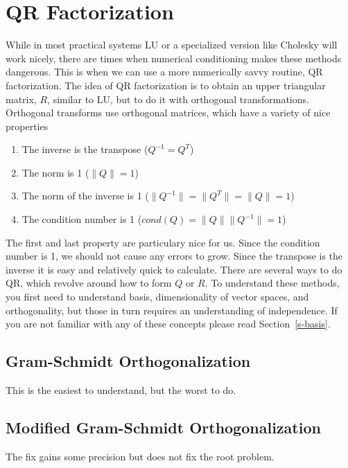 
\section{QR Factorization}

While in most practical systems LU or a specialized version like Cholesky will work nicely, there are times when numerical conditioning makes these methods dangerous.  This is when we can use a more numerically savvy routine, QR factorization.  The idea of QR factorization is to obtain an upper triangular matrix, $R$, similar to LU, but to do it with orthogonal transformations. Orthogonal transforms use orthogonal matrices, which have a variety of nice properties
\begin{enumerate}
  \item The inverse is the transpose ($Q^{-1}=Q^T$)
  \item The norm is 1 ($\|Q\|=1$)
  \item The norm of the inverse is 1 ($\|Q^{-1}\|=\|Q^T\|=\|Q\|=1$)
  \item The condition number is 1 ($cond(Q)=\|Q\|\|Q^{-1}\|=1$)
\end{enumerate}
The first and last property are particulary nice for us.  Since the condition number is 1, we should not cause any errors to grow.  Since the transpose is the inverse it is easy and relatively quick to calculate.  There are several ways to do QR, which revolve around how to form $Q$ or $R$.  To understand these methods, you first need to understand basis, dimensionality of vector spaces, and orthogonality, but those in turn requires an understanding of independence.  If you are not familiar with any of these concepts please read Section~\ref{s-basis}.

\subsection{Gram-Schmidt Orthogonalization}
This is the easiest to understand, but the worst to do.

\subsection{Modified Gram-Schmidt Orthogonalization}
The fix gains some precision but does not fix the root problem.

